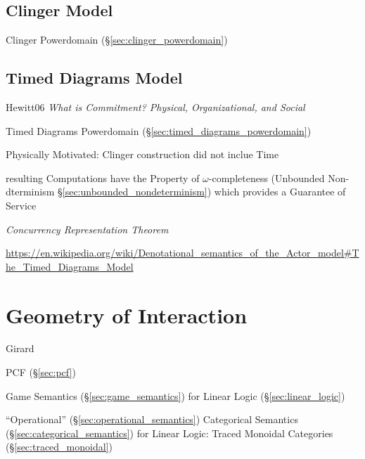 \subsection{Clinger Model}\label{sec:clinger_model}

Clinger Powerdomain (\S\ref{sec:clinger_powerdomain})



\subsection{Timed Diagrams Model}\label{sec:timed_diagrams}

Hewitt06 \emph{What is Commitment? Physical, Organizational, and
  Social}

Timed Diagrams Powerdomain (\S\ref{sec:timed_diagrams_powerdomain})

Physically Motivated: Clinger construction did not inclue Time

resulting Computations have the Property of $\omega$-completeness
(Unbounded Non-dterminism \S\ref{sec:unbounded_nondeterminism}) which
provides a Guarantee of Service %


\emph{Concurrency Representation Theorem} %

\url{https://en.wikipedia.org/wiki/Denotational_semantics_of_the_Actor_model#The_Timed_Diagrams_Model}


\endgroup



\section{Geometry of Interaction}\label{sec:interaction_geometry}

Girard

PCF (\S\ref{sec:pcf})

Game Semantics (\S\ref{sec:game_semantics}) for Linear Logic
(\S\ref{sec:linear_logic})

``Operational'' (\S\ref{sec:operational_semantics}) Categorical
Semantics (\S\ref{sec:categorical_semantics}) for Linear Logic: Traced
Monoidal Categories (\S\ref{sec:traced_monoidal})

